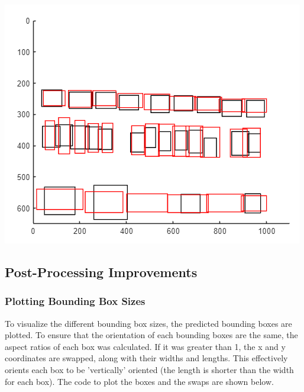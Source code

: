 \documentclass[man]{apa7}
\begin{document}
\begin{minipage}{\linewidth}
  \includegraphics[]{figures/plottedBoxesUnimproved.png}
  \label{fig:unimprovedBoxes}
\end{minipage}

\subsection{Post-Processing Improvements}

\subsubsection{Plotting Bounding Box Sizes}

To visualize the different bounding box sizes, the predicted bounding boxes are plotted. To ensure that the orientation of each bounding boxes are the same, the aspect ratios of each box was calculated. If it was greater than 1, the x and y coordinates are swapped, along with their widths and lengths. This effectively orients each box to be 'vertically' oriented (the length is shorter than the width for each box). The code to plot the boxes and the swaps are shown below. 
\end{document}
